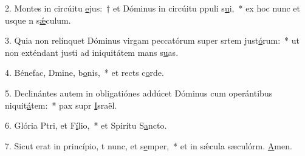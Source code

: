 2. Montes in circúitu \uline{e}jus:~† et Dóminus in circúitu ppuli s\uline{u}i,~* ex hoc nunc et usque n s\uline{ǽ}culum.\par 
3. Quia non relínquet Dóminus virgam peccatórum super srtem just\uline{ó}rum:~* ut non exténdant justi ad iniquitátem mans s\uline{u}as.\par 
4. Bénefac, Dmine, b\uline{o}nis,~* et rects c\uline{o}rde.\par 
5. Declinántes autem in obligatiónes addúcet Dóminus cum operántibus niquit\uline{á}tem:~* pax supr \uline{I}sraël.\par 
6. Glória Ptri, et F\uline{í}lio,~* et Spirítu S\uline{a}ncto.\par 
7. Sicut erat in princípio, t nunc, et s\uline{e}mper,~* et in sǽcula sæculórm. \uline{A}men.\par 
